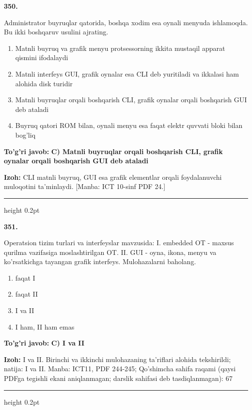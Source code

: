 \documentclass[10pt,a4paper]{article}
\begin{document}
{\bfseries\sffamily\color{ink} 350.}
\par
Administrator buyruqlar qatorida, boshqa xodim esa oynali menyuda ishlamoqda. Bu ikki boshqaruv usulini ajrating.
\begin{enumerate}[label=\Alph*),leftmargin=9mm]
\item Matnli buyruq va grafik menyu protsessorning ikkita mustaqil apparat qismini ifodalaydi
\item Matnli interfeys GUI, grafik oynalar esa CLI deb yuritiladi va ikkalasi ham alohida disk turidir
\item Matnli buyruqlar orqali boshqarish CLI, grafik oynalar orqali boshqarish GUI deb ataladi
\item Buyruq qatori ROM bilan, oynali menyu esa faqat elektr quvvati bloki bilan bog'liq
\end{enumerate}
\begin{tcolorbox}[enhanced,breakable,colback=teal!4,colframe=teal!60!black,boxrule=0.45pt,arc=1.2mm,left=2.7mm,right=2.7mm,top=1.8mm,bottom=1.8mm,before skip=2mm,after skip=2mm]
{\bfseries\sffamily\color{teal}To'g'ri javob:} \textbf{C) Matnli buyruqlar orqali boshqarish CLI, grafik oynalar orqali boshqarish GUI deb ataladi}
\par\smallskip
{\bfseries Izoh:} CLI matnli buyruq, GUI esa grafik elementlar orqali foydalanuvchi muloqotini ta'minlaydi. [Manba: ICT 10-sinf PDF 24.]
\end{tcolorbox}
\vspace{2mm}\hrule height 0.2pt\vspace{3mm}

{\bfseries\sffamily\color{ink} 351.}
\par
Operatsion tizim turlari va interfeyslar mavzusida: I. embedded OT - maxsus qurilma vazifasiga moslashtirilgan OT. II. GUI - oyna, ikona, menyu va ko'rsatkichga tayangan grafik interfeys. Mulohazalarni baholang.
\begin{enumerate}[label=\Alph*),leftmargin=9mm]
\item faqat I
\item faqat II
\item I va II
\item I ham, II ham emas
\end{enumerate}
\begin{tcolorbox}[enhanced,breakable,colback=teal!4,colframe=teal!60!black,boxrule=0.45pt,arc=1.2mm,left=2.7mm,right=2.7mm,top=1.8mm,bottom=1.8mm,before skip=2mm,after skip=2mm]
{\bfseries\sffamily\color{teal}To'g'ri javob:} \textbf{C) I va II}
\par\smallskip
{\bfseries Izoh:} I va II. Birinchi va ikkinchi mulohazaning ta'riflari alohida tekshirildi; natija: I va II. Manba: ICT11, PDF 244-245; Qo'shimcha sahifa raqami (qaysi PDFga tegishli ekani aniqlanmagan; darslik sahifasi deb tasdiqlanmagan): 67
\end{tcolorbox}
\vspace{2mm}\hrule height 0.2pt\vspace{3mm}
\end{document}
